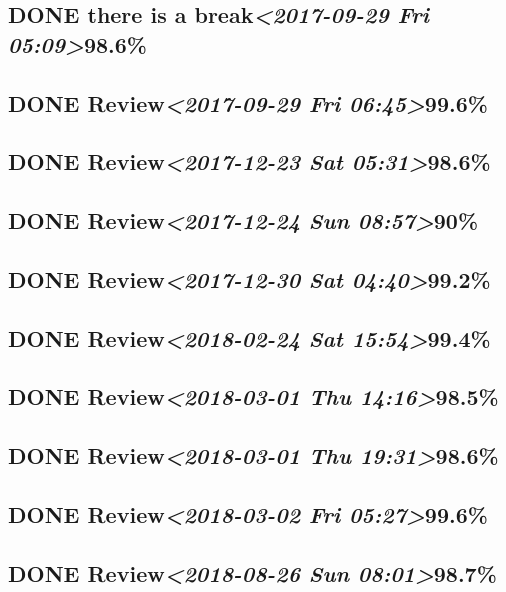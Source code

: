 \documentclass[11pt]{ctexart}
\begin{document}
\subsection{{\bfseries\sffamily DONE} there is a break\textit{<2017-09-29 Fri 05:09>}98.6\%}
\label{sec:org12aaef3}
\subsection{{\bfseries\sffamily DONE} Review\textit{<2017-09-29 Fri 06:45>}99.6\%}
\label{sec:org6e284a8}

\subsection{{\bfseries\sffamily DONE} Review\textit{<2017-12-23 Sat 05:31>}98.6\%}
\label{sec:org26d4247}
\subsection{{\bfseries\sffamily DONE} Review\textit{<2017-12-24 Sun 08:57>}90\%}
\label{sec:org8a236c4}
\subsection{{\bfseries\sffamily DONE} Review\textit{<2017-12-30 Sat 04:40>}99.2\%}
\label{sec:orgc35c62d}
\subsection{{\bfseries\sffamily DONE} Review\textit{<2018-02-24 Sat 15:54>}99.4\%}
\label{sec:org7061182}
\subsection{{\bfseries\sffamily DONE} Review\textit{<2018-03-01 Thu 14:16>}98.5\%}
\label{sec:orgfa158a4}
\subsection{{\bfseries\sffamily DONE} Review\textit{<2018-03-01 Thu 19:31>}98.6\%}
\label{sec:org817a39d}
\subsection{{\bfseries\sffamily DONE} Review\textit{<2018-03-02 Fri 05:27>}99.6\%}
\label{sec:org5e44b45}
\subsection{{\bfseries\sffamily DONE} Review\textit{<2018-08-26 Sun 08:01>}98.7\%}
\label{sec:orgec45c1c}
\end{document}
